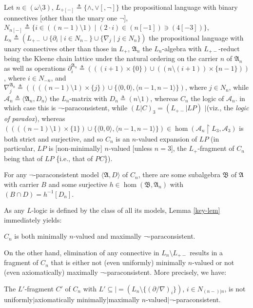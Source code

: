 \documentclass[bsl,meeting]{asl}
\newcommand{\mf}[1]{\mathfrak{#1}}
\newcommand{\mc}[1]{\mathcal{#1}}
\newcommand{\couple}[2]{\langle{#1},{#2}\rangle}
\newcommand{\inverse}[1]{{#1}^{-1}}
\newcommand{\restr}{{\upharpoonright}}
\begin{document}
Let $n\in(\omega\setminus3)$,
$L_{+[-]}\triangleq\{\land,\lor[,\neg]\}$
the propositional language with binary connectives
[other than the unary one $\neg$],
$N_{n[-]}\triangleq\{i\in((n-1)\setminus1)\mid(2\cdot
i)\in(n[-1])\ni(4[-3])\}$,
$L_n\triangleq(L_{+-}\cup\{\partial_i\mid i\in N_{n-}\}\cup
\{\nabla_j\mid j\in N_n\})$
the propositional language with unary connectives
other than those in $L_+$,
$\mf{A}_n$ the $L_n$-algebra with $L_{+-}$-reduct
being the Kleene chain lattice under the natural ordering
on the carrier $n$ of $\mf{A}_n$ as well as operations
$\partial_i^{\mf{A}_n}\triangleq(((i+1)\times\{0\})\cup((n\setminus(i+1))\times\{n-1\}))$,
where $i\in N_{-n}$, and $\nabla_j^{\mf{A}_n}\triangleq
((((n-1)\setminus1)\times\{j\})\cup\{\couple{0}{0},\couple{n-1}{n-1}\})$,
where $j\in N_n$,
while $\mc{A}_n\triangleq\couple{\mf{A}_n}{D_n}$ the $L_n$-matrix
with $D_n\triangleq(n\setminus1)$, whereas
$C_n$ the logic of $\mc{A}_n$.
in which case this is $\neg$-paraconsistent,
while $(L|C)_3=(L_{+-}|LP)$ $|$(viz., the {\em logic of
paradox\/}),
whereas $((((n-1)\setminus1)\times\{1\})\cup\{\couple{0}{0},\couple{n-1}{n-1}\})
\in\hom(\mc{A}_n\restr L_3,\mc{A}_3)$ is both strict and
surjective, and so $C_n$ is an $n$-valued expansion of $LP$
(in particular, $LP$ is [non-minimally] $n$-valued [unless
$n=3$], the $L_+$-fragment of $C_n$ being that of $LP$
\{i.e., that of $PC$\}).

\begin{lemma} %
\label{key-lem}
For any\/ $\neg$-paraconsistent model\/ $\couple{\mf{A}}{D}$ of\/
$C_n$,
there are some
subalgebra\/ $\mf{B}$ of\/ $\mf{A}$ with carrier\/ $B$
and some surjective $h\in\hom(\mf{B},\mf{A}_n)$
with\/ $(B\cap D)=\inverse{h}[D_n]$.
\end{lemma}

As any $L$-logic is defined by the class of all its models,
Lemma \ref{key-lem} immediately yields:

\begin{theorem}
\label{main-thm}
$C_n$ is both minimally $n$-valued and maximally\/
$\neg$-paraconsistent.
\end{theorem}

On the other hand, elimination of any connective in $L_n\setminus
L_{+-}$ results in a fragment of $C_n$ that is either
not (even uniformly)
minimally $n$-valued or not
(even axiomatically) maximally $\neg$-paraconsistent.
More precisely, we have:

\begin{theorem}
\label{non-thm}
The\/ $L'$-fragment\/ $C'$ of\/ $C_n$
with\/
$L'\subseteq|=(L_n\setminus\{(\partial/\nabla)_i\})$,
$i\in N_{(n-)|n}$,
is not
uniformly\/$|$axiomatically minimally\/$|$maximally
$n$-valued\/$|\neg$-paraconsistent.
\end{theorem}
\end{document}
